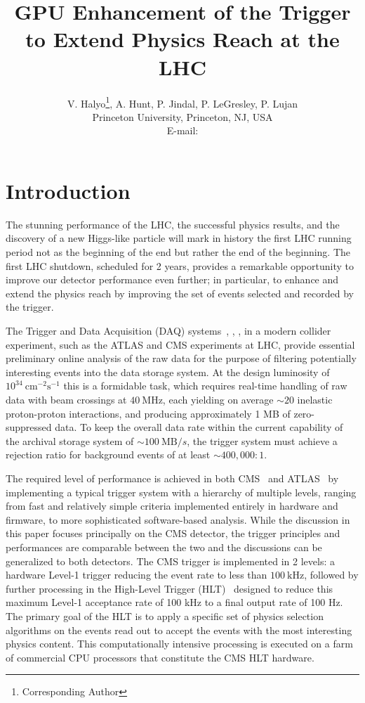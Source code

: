 \documentclass{JINST}
\title{GPU Enhancement of the Trigger to Extend Physics Reach at the LHC}
\author{V. Halyo\thanks{Corresponding Author}, A. Hunt, P. Jindal, P. LeGresley, P. Lujan \\
\llap Princeton University, Princeton, NJ, USA \\
E-mail: \email{vhalyo@gmail.com}}
\begin{document}
% 
% 
\section{Introduction} 
% 

The stunning performance of the LHC, the successful physics results, and the discovery of 
a new Higgs-like particle will mark in history the first LHC running period not as the beginning of the end but rather
the end of the beginning. The first LHC shutdown, scheduled for 2 years, provides a remarkable opportunity to
improve our detector performance even further; in particular, to enhance and extend the physics reach by improving the set of events selected and recorded by the trigger.

The Trigger and Data Acquisition (DAQ) systems~\cite{Sphicas:2002gg}, \cite{ATLAS:2003aa}, \cite{Chatrchyan:2008aa}, \cite{Aad:2008zzm}
in a modern collider experiment, such as the ATLAS and CMS experiments at LHC, provide essential preliminary online analysis of the raw data for the purpose of
filtering potentially interesting events into the data storage system.
At the design luminosity of $10^{34}~\mathrm{cm}^{-2}\mathrm{s}^{-1}$ this is a formidable task,
which requires real-time handling of raw data with beam crossings at $40~\mathrm{MHz}$, each yielding
on average ${\sim}20$ inelastic proton-proton interactions, and producing approximately 1 MB of zero-suppressed data.
To keep the overall data rate within the current capability of the archival storage
system of ${\sim}100~\mathrm{MB}/s$, the trigger system must achieve a rejection ratio for background
events of at least ${\sim}400,000:1$.

The required level of performance is achieved in both CMS~\cite{Chatrchyan:2008aa} and ATLAS~\cite{Aad:2008zzm}
 by implementing a typical trigger system with a hierarchy of multiple levels, ranging from fast and relatively simple criteria implemented
entirely in hardware and firmware, to more sophisticated software-based analysis. 
While the discussion in this paper focuses principally on the CMS detector, the trigger principles and performances are
comparable between the two and the discussions can be generalized to both detectors.
The CMS trigger is implemented in 2 levels: a hardware Level-1 trigger reducing the event rate
to less than $100~\mathrm{kHz}$, followed by further processing in the High-Level Trigger (HLT)~\cite{Sakulin:2007rj}
designed to reduce this maximum Level-1 acceptance rate of 100 kHz to a final output rate of 100 Hz.
The primary goal of the HLT is to apply a specific set of
physics selection algorithms on the events read out to accept the events with the most interesting physics 
content. This computationally intensive processing is executed on a farm of commercial CPU processors that
constitute the CMS HLT hardware.
\end{document}
